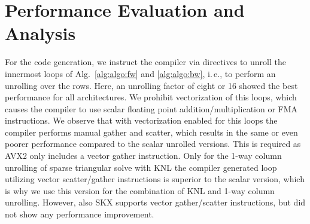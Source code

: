 %
%
%

\section{Performance Evaluation and Analysis}
\label{sec:pa}
\label{sec:performance}


For the code generation, we instruct
the compiler via directives to unroll the
innermost loops of Alg.~\ref{alg:algo:fw} and \ref{alg:algo:bw}, i.\,e.,
to perform an unrolling over the rows.
Here, an unrolling factor of eight or 16 showed the best
performance for all architectures.
%
We prohibit vectorization of this loops, which causes the
compiler to use scalar floating point addition/multiplication or FMA
instructions.
%
We observe that
with vectorization enabled for this loops the compiler
performs manual gather and scatter, which results in the same or even poorer
performance compared to the scalar unrolled versions.
This is required as AVX2 only includes a vector gather instruction.
%
Only for the 1-way column unrolling of sparse triangular solve
with KNL the compiler
generated loop utilizing vector scatter/gather instructions is superior to
the scalar version, which is why we use this version for the combination of KNL
and 1-way column unrolling.
However, also SKX supports vector gather/scatter instructions, but did not
show any performance improvement.

